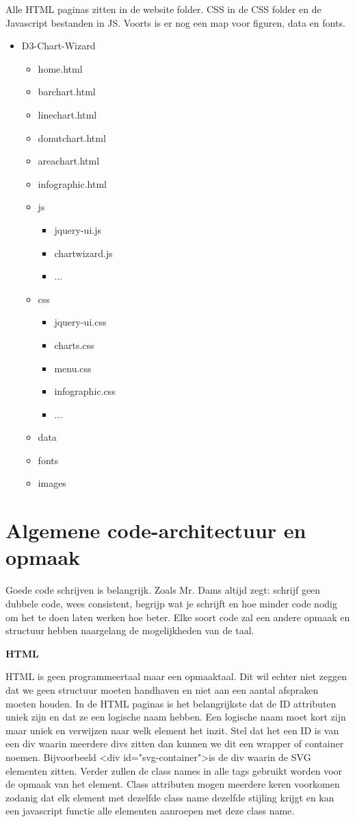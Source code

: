 Alle HTML paginas zitten in de website folder. CSS in de CSS folder en de Javascript bestanden in JS. Voorts is er nog een map voor figuren, data en fonts.
\begin{itemize}
\item D3-Chart-Wizard
	\begin{itemize}
	\item home.html
	\item barchart.html
	\item linechart.html
	\item donutchart.html
	\item areachart.html
	\item infographic.html
	\item js
		\begin{itemize}
		\item jquery-ui.js
		\item chartwizard.js
		\item ...
		\end{itemize}
	\item css
		\begin{itemize}
		\item jquery-ui.css
		\item charts.css
		\item menu.css
		\item infographic.css
		\item ...
		\end{itemize}
	\item data
	\item fonts
	\item images
	\end{itemize}
\end{itemize}

\section{Algemene code-architectuur en opmaak}

Goede code schrijven is belangrijk. Zoals Mr. Dams altijd zegt: schrijf geen dubbele code, wees consistent, begrijp wat je schrijft en hoe minder code nodig om het te doen laten werken hoe beter. Elke soort code zal een andere opmaak en structuur hebben naargelang de mogelijkheden van de taal. 

\textbf{HTML}

HTML is geen programmeertaal maar een opmaaktaal. Dit wil echter niet zeggen dat we geen structuur moeten handhaven en niet aan een aantal afspraken moeten houden. In de HTML paginas is het belangrijkste dat de ID attributen uniek zijn en dat ze een logische naam hebben. Een logische naam moet kort zijn maar uniek en verwijzen naar welk element het inzit. Stel dat het een ID is van een div waarin meerdere divs zitten dan kunnen we dit een wrapper of container noemen. Bijvoorbeeld \textless div id="svg-container"\textgreater  is de div waarin de SVG elementen zitten. Verder zullen de class names in alle tags gebruikt worden voor de opmaak van het element. Class attributen mogen meerdere keren voorkomen zodanig dat elk element met dezelfde class name dezelfde stijling krijgt en kan een javascript functie alle elementen aanroepen met deze class name. 

